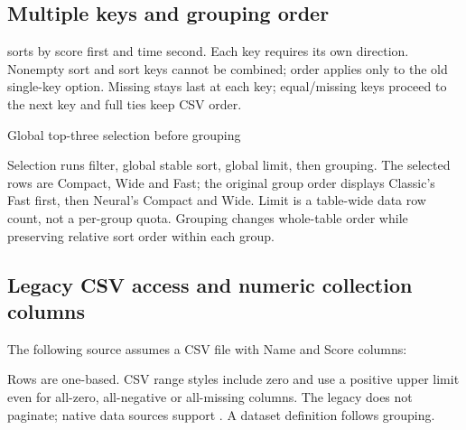 \subsection{Multiple keys and grouping order}
\begin{sloppypar}
 sorts by score first and time
second. Each key requires its own direction. Nonempty sort and sort keys cannot
be combined; order applies only to the old single-key option. Missing stays last
at each key; equal/missing keys proceed to the next key and full ties keep CSV order.
\end{sloppypar}
\begin{demo}{Global top-three selection before grouping}
\begin{center}
\begin{gradtable}[align=c,header align=c,data=families,width=\linewidth,
  sort keys={score/descending,time/ascending},limit=3,group by=family]
\end{gradtable}
\end{center}
\end{demo}
Selection runs filter, global stable sort, global limit, then grouping.
The selected rows are Compact, Wide and Fast; the original group order displays
Classic's Fast first, then Neural's Compact and Wide. Limit is a table-wide data
row count, not a per-group quota. Grouping changes whole-table order while
preserving relative sort order within each group.

\subsection{Legacy CSV access and numeric collection columns}

The following source assumes a CSV file with Name and Score columns:
\begin{source}
\begin{center}
\end{center}
\end{source}
Rows are one-based. CSV range styles include zero and use a positive upper limit
even for all-zero, all-negative or all-missing columns. The legacy 
does not paginate; native  data sources support . A dataset definition follows grouping.

